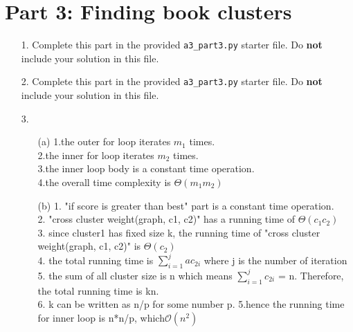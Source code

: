 \documentclass[11pt]{article}
\begin{document}
    \section*{Part 3: Finding book clusters}

    \begin{enumerate}

        \item[1.]
        Complete this part in the provided \texttt{a3\_part3.py} starter file.
        Do \textbf{not} include your solution in this file.

        \item[2.]
        Complete this part in the provided \texttt{a3\_part3.py} starter file.
        Do \textbf{not} include your solution in this file.

        \item[3.]

        \begin{enumerate}
            \item[(a)]
            1.the outer for loop iterates $m_1$ times. \\
            2.the inner for loop iterates $m_2$ times. \\
            3.the inner loop body is a constant time operation. \\
            4.the overall time complexity is $\Theta{(m_1 m_2)}$

            \item[(b)]
            1. "if score is greater than best" part is a constant time operation. \\
            2. "cross cluster weight(graph, c1, c2)" has a running time of $\Theta{(c_1 c_2)}$ \\
            3. since cluster1 has fixed size k, the running time of "cross cluster weight(graph, c1, c2)" is $\Theta{(c_2)}$\\
            4. the total running time is $\sum_{i=1}^{j}ac_{2i}$ where j is the number of iteration\\
            5. the sum of all cluster size is n which means  $\sum_{i=1}^{j}c_{2i}$ = n. Therefore, the total running time is kn.\\
            6. k can be written as n/p for some number p.
            5.hence the running time for inner loop is n*n/p, which$\mathcal{O}(n^2)$



\end{enumerate}
\end{enumerate}
\end{document}
